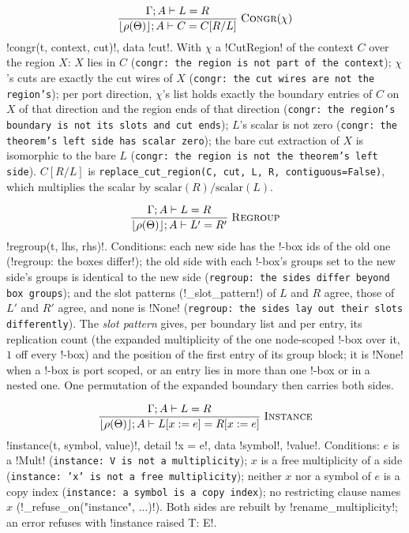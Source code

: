 \[
\frac{\Gamma;A\vdash L=R}{\lfloor\rho(\Theta)\rfloor;A\vdash C=C[R/L]}\;\textsc{Congr}(\chi)
\]
\py!congr(t, context, cut)!, data \code!cut!. With $\chi$ a \py!CutRegion! of the context $C$ over the region $X$: $X$ lies in $C$ (\texttt{congr: the region is not part of the context}); $\chi$'s cuts are exactly the cut wires of $X$ (\texttt{congr: the cut wires are not the region's}); per port direction, $\chi$'s list holds exactly the boundary entries of $C$ on $X$ of that direction and the region ends of that direction (\texttt{congr: the region's boundary is not its slots and cut ends}); $L$'s scalar is not zero (\texttt{congr: the theorem's left side has scalar zero}); the bare cut extraction of $X$ is isomorphic to the bare $L$ (\texttt{congr: the region is not the theorem's left side}). $C[R/L]$ is \texttt{replace\_\allowbreak{}cut\_\allowbreak{}region(\allowbreak{}C,\allowbreak{} cut,\allowbreak{} L,\allowbreak{} R,\allowbreak{} contiguous=False)}, which multiplies the scalar by $\text{scalar}(R)/\text{scalar}(L)$.

\[
\frac{\Gamma;A\vdash L=R}{\lfloor\rho(\Theta)\rfloor;A\vdash L'=R'}\;\textsc{Regroup}
\]
\py!regroup(t, lhs, rhs)!. Conditions: each new side has the !-box ids of the old one (\code!regroup: the boxes differ!); the old side with each !-box's groups set to the new side's groups is identical to the new side (\texttt{regroup: the sides differ beyond box groups}); and the slot patterns (\py!_slot_pattern!) of $L$ and $R$ agree, those of $L'$ and $R'$ agree, and none is \py!None! (\texttt{regroup: the sides lay out their slots differently}). The \emph{slot pattern} gives, per boundary list and per entry, its replication count (the expanded multiplicity of the one node-scoped !-box over it, $1$ off every !-box) and the position of the first entry of its group block; it is \py!None! when a !-box is port scoped, or an entry lies in more than one !-box or in a nested one. One permutation of the expanded boundary then carries both sides.

\[
\frac{\Gamma;A\vdash L=R}{\lfloor\rho(\Theta)\rfloor;A\vdash L[x:=e]=R[x:=e]}\;\textsc{Instance}
\]
\py!instance(t, symbol, value)!, detail \code!x = e!, data \code!symbol!, \code!value!. Conditions: $e$ is a \py!Mult! (\texttt{instance: V is not a multiplicity}); $x$ is a free multiplicity of a side (\texttt{instance: 'x' is not a free multiplicity}); neither $x$ nor a symbol of $e$ is a copy index (\texttt{instance: a symbol is a copy index}); no restricting clause names $x$ (\py!_refuse_on("instance", ...)!). Both sides are rebuilt by \py!rename_multiplicity!; an error refuses with \code!instance raised T: E!.

